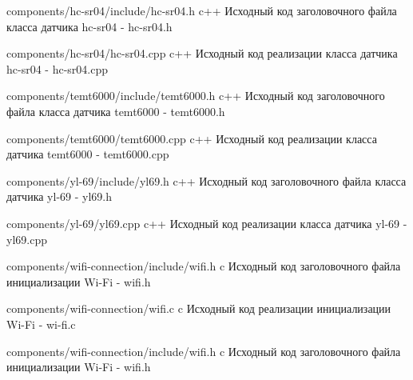 \documentclass{bmstu}
\begin{document}
\begin{appendices}
        {components/hc-sr04/include/hc-sr04.h} %
        {c++}
        {Исходный код заголовочного файла класса датчика hc-sr04 - hc-sr04.h} %

        {components/hc-sr04/hc-sr04.cpp} %
        {c++}
        {Исходный код реализации класса датчика hc-sr04 - hc-sr04.cpp} %

        {components/temt6000/include/temt6000.h} %
        {c++}
        {Исходный код заголовочного файла класса датчика temt6000 - temt6000.h} %

        {components/temt6000/temt6000.cpp} %
        {c++}
        {Исходный код реализации класса датчика temt6000 - temt6000.cpp} %


        {components/yl-69/include/yl69.h} %
        {c++}
        {Исходный код заголовочного файла класса датчика yl-69 - yl69.h} %

        {components/yl-69/yl69.cpp} %
        {c++}
        {Исходный код реализации класса датчика yl-69 - yl69.cpp} %


        {components/wifi-connection/include/wifi.h} %
        {c}
        {Исходный код заголовочного файла инициализации Wi-Fi - wifi.h} %

        {components/wifi-connection/wifi.c} %
        {c}
        {Исходный код реализации инициализации Wi-Fi - wi-fi.c} %

        {components/wifi-connection/include/wifi.h} %
        {c}
        {Исходный код заголовочного файла инициализации Wi-Fi - wifi.h} %


\end{appendices}
\end{document}
